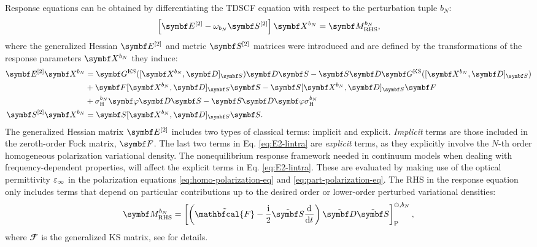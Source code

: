 Response equations can be obtained by differentiating the
\acrshort{TDSCF} equation with respect to the perturbation tuple
$b_N$:\autocite{Thorvaldsen2008-sg, Ringholm2014-gx}
\begin{equation}\label{eq:response-equation}
 \left[\genHessian - \omega_{b_N}\genMetric \right]\rspParam{b_N} =
 \RHS{b_N},
\end{equation}
where the generalized Hessian $\genHessian$ and metric $\genMetric$
matrices were introduced and are defined by the transformations of the
response parameters $\rspParam{b_N}$ they induce:\autocite{Larsen2000-hj,
Kjaergaard2008-hy}
\begin{subequations}
\begin{align}
  \genHessian\rspParam{b_N} &=
  \mat{G}^\mathrm{KS}([\rspParam{b_N}, \mat{D}]_{\mat{S}})\mat{D}\mat{S}
  -\mat{S}\mat{D}\mat{G}^\mathrm{KS}([\rspParam{b_N},
  \mat{D}]_{\mat{S}}) \nonumber \\
&+\mat{F} [\rspParam{b_N}, \mat{D}]_{\mat{S}} \mat{S}
-\mat{S} [\rspParam{b_N}, \mat{D}]_{\mat{S}} \mat{F}
\label{eq:E2-lintra} \\
&+ \ASCh{b_N}\mat{\esp}\mat{D}\mat{S}
-\mat{S}\mat{D}\mat{\esp}\ASCh{b_N} \nonumber
\\
  \genMetric\rspParam{b_N} &= \mat{S} [\rspParam{b_N}, \mat{D}]_{\mat{S}} \mat{S} \text{.}
  \label{eq:S2-lintra}
\end{align}
\end{subequations}
The generalized Hessian matrix $\genHessian$ includes two types of
classical terms: implicit and explicit. \emph{Implicit} terms are those
included in the zeroth-order Fock matrix, $\mat{F}$.
The last two terms in Eq. \ref{eq:E2-lintra} are \emph{explicit} terms,
as they explicitly involve the $N$-th order homogeneous polarization
variational density.
The nonequilibrium response framework needed in continuum models when
dealing with frequency-dependent properties,\autocite{Cammi1999-rb, Tomasi2005-vm}
will affect the explicit terms in Eq. \eqref{eq:E2-lintra}. These are
evaluated by making use of the optical permittivity $\varepsilon_\infty$ in the
polarization equations \eqref{eq:homo-polarization-eq} and \eqref{eq:part-polarization-eq}.
The \acrlong{RHS} in the response equation only includes terms that
depend on particular contributions up to the desired order or
lower-order perturbed variational densities:\autocite{Ringholm2014-gx}
\begin{equation}\label{eq:RHS}
  \RHS{b_N} =
  \left[\left( \tilde{\mathbfcal{F}}
-
\frac{\mathrm{i}}{2}\pertmat{S}\deriv{}{t}\right)\pertmat{D}\pertmat{S}\right]^{\ominus,
b_N}_\mathrm{P},
\end{equation}
where $\mathbfcal{F}$ is the generalized \acrshort{KS} matrix, see
 for details.


